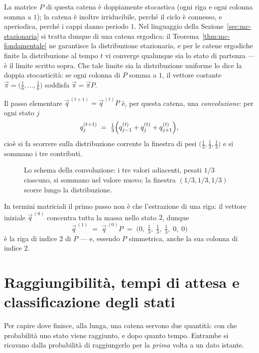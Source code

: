 \begin{osservazione}
La matrice $P$ di questa catena è doppiamente stocastica (ogni riga e ogni colonna
somma a $1$); la catena è inoltre irriducibile, perché il ciclo è connesso, e
aperiodica, perché i cappi danno periodo $1$. Nel linguaggio della
Sezione~\ref{sec:mc-stazionaria} si tratta dunque di una catena ergodica: il
Teorema~\ref{thm:mc-fondamentale} ne garantisce la distribuzione stazionaria, e per le
catene ergodiche finite la distribuzione al tempo $t$ vi converge qualunque sia lo stato
di partenza --- è il limite scritto sopra. Che tale limite sia la distribuzione uniforme
lo dice la doppia stocasticità: se ogni colonna di $P$ somma a $1$, il vettore costante
$\vec{\pi} = \bigl(\tfrac16,\dots,\tfrac16\bigr)$ soddisfa $\vec{\pi} = \vec{\pi}P$.
\end{osservazione}

\begin{osservazione}
Il passo elementare $\vec{q}^{\,(t+1)} = \vec{q}^{\,(t)}P$ è, per questa catena, una
\emph{convoluzione}: per ogni stato $j$
\[
  q^{(t+1)}_{j} \;=\;
  \tfrac13\Bigl(q^{(t)}_{j-1} + q^{(t)}_{j} + q^{(t)}_{j+1}\Bigr),
\]
cioè si fa scorrere sulla distribuzione corrente la finestra di pesi
$\bigl(\tfrac13,\tfrac13,\tfrac13\bigr)$ e si sommano i tre contributi.

\begin{figure}[H]
\centering

\caption{Lo schema della convoluzione: i tre valori adiacenti, pesati $1/3$
ciascuno, si sommano nel valore nuovo; la finestra $(1/3,1/3,1/3)$ scorre lungo
la distribuzione.}
\label{fig:p74-convoluzione}
\end{figure}
\end{osservazione}

In termini matriciali il primo passo non è che l'estrazione di una riga: il vettore
iniziale $\vec{q}^{\,(0)}$ concentra tutta la massa nello stato $2$, dunque
\[
  \vec{q}^{\,(1)} \;=\; \vec{q}^{\,(0)} P \;=\; \bigl(0,\;\tfrac13,\;\tfrac13,\;\tfrac13,\;0,\;0\bigr)
\]
è la riga di indice $2$ di $P$ — e, essendo $P$ simmetrica, anche la sua colonna di
indice $2$.


\section{Raggiungibilità, tempi di attesa e classificazione degli stati}

Per capire dove finisce, alla lunga, una catena servono due quantità: con che
probabilità uno stato viene raggiunto, e dopo quanto tempo. Entrambe si ricavano dalla
probabilità di raggiungerlo per la \emph{prima} volta a un dato istante.

